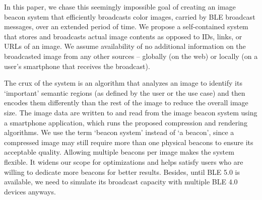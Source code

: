 

In this paper, we chase this seemingly impossible goal of creating an image beacon system that efficiently broadcasts color images, carried by BLE broadcast messages, over an extended period of time. We propose a self-contained system that stores and broadcasts actual image contents as opposed to IDs, links, or URLs of an image. We assume availability of no additional information on the broadcasted image from any other sources -- globally (on the web) or locally (on a user's smartphone that receives the broadcast).

The crux of the system is an algorithm that analyzes an image to identify its `important' semantic regions (as defined by the user or the use case) and then encodes them differently than the rest of the image to reduce the overall image size. The image data are written to and read from the image beacon system using a smartphone application, which runs the proposed compression and rendering algorithms. We use the term `beacon system' instead of `a beacon', since a compressed image may still require more than one physical beacons to ensure its acceptable quality. Allowing multiple beacons per image makes the system flexible. It widens our scope for optimizations and helps satisfy users who are willing to dedicate more beacons for better results. Besides, until BLE 5.0 is available, we need to simulate its broadcast capacity with multiple BLE 4.0 devices anyways.

